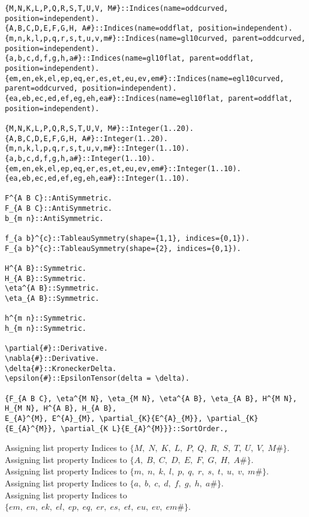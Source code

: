 \documentclass[11pt]{article}
\begin{document}
{\color[named]{Blue}\begin{verbatim}
{M,N,K,L,P,Q,R,S,T,U,V, M#}::Indices(name=oddcurved, position=independent).
{A,B,C,D,E,F,G,H, A#}::Indices(name=oddflat, position=independent).
{m,n,k,l,p,q,r,s,t,u,v,m#}::Indices(name=gl10curved, parent=oddcurved, position=independent).
{a,b,c,d,f,g,h,a#}::Indices(name=gl10flat, parent=oddflat, position=independent).
{em,en,ek,el,ep,eq,er,es,et,eu,ev,em#}::Indices(name=egl10curved, parent=oddcurved, position=independent).
{ea,eb,ec,ed,ef,eg,eh,ea#}::Indices(name=egl10flat, parent=oddflat, position=independent).

{M,N,K,L,P,Q,R,S,T,U,V, M#}::Integer(1..20).
{A,B,C,D,E,F,G,H, A#}::Integer(1..20).
{m,n,k,l,p,q,r,s,t,u,v,m#}::Integer(1..10).
{a,b,c,d,f,g,h,a#}::Integer(1..10).
{em,en,ek,el,ep,eq,er,es,et,eu,ev,em#}::Integer(1..10).
{ea,eb,ec,ed,ef,eg,eh,ea#}::Integer(1..10).

F^{A B C}::AntiSymmetric.
F_{A B C}::AntiSymmetric.
b_{m n}::AntiSymmetric.

f_{a b}^{c}::TableauSymmetry(shape={1,1}, indices={0,1}).
F_{a b}^{c}::TableauSymmetry(shape={2}, indices={0,1}).

H^{A B}::Symmetric.
H_{A B}::Symmetric.
\eta^{A B}::Symmetric.
\eta_{A B}::Symmetric.

h^{m n}::Symmetric.
h_{m n}::Symmetric.

\partial{#}::Derivative.
\nabla{#}::Derivative.
\delta{#}::KroneckerDelta.
\epsilon{#}::EpsilonTensor(delta = \delta).

{F_{A B C}, \eta^{M N}, \eta_{M N}, \eta^{A B}, \eta_{A B}, H^{M N}, H_{M N}, H^{A B}, H_{A B},
E_{A}^{M}, E^{A}_{M}, \partial_{K}{E^{A}_{M}}, \partial_{K}{E_{A}^{M}}, \partial_{K L}{E_{A}^{M}}}::SortOrder.,
\end{verbatim}}
Assigning list property Indices to $\{M,\; N,\; K,\; L,\; P,\; Q,\; R,\; S,\; T,\; U,\; V,\; M\#\}$.
\\
Assigning list property Indices to $\{A,\; B,\; C,\; D,\; E,\; F,\; G,\; H,\; A\#\}$.
\\
Assigning list property Indices to $\{m,\; n,\; k,\; l,\; p,\; q,\; r,\; s,\; t,\; u,\; v,\; m\#\}$.
\\
Assigning list property Indices to $\{a,\; b,\; c,\; d,\; f,\; g,\; h,\; a\#\}$.
\\
Assigning list property Indices to $\{em,\; en,\; ek,\; el,\; ep,\; eq,\; er,\; es,\; et,\; eu,\; ev,\; em\#\}$.
\end{document}
